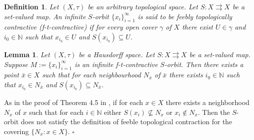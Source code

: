 \documentclass{article}
\renewcommand{\emptyset}{\varnothing}
\newcommand{\N}{\mathbb{N}}
\renewenvironment{proof}
         {\begin{trivlist}\item[
         {\bf Proof.}]}{{\hfill $\square$} \end{trivlist}}
\newtheorem{defi}[theo]{Definition}
\newtheorem{lemma}[theo]{Lemma}
\begin{document}


\begin{defi} \label{tau-contr} Let $(X, \tau)$ be an arbitrary topological space. Let $S:X \rightrightarrows X$ be a set-valued map. An infinite $S$-orbit $\{x_i\}_{i = 1}^{\infty}$ is said to be feebly topologically contractive (f-t-contractive) if for every open cover $\gamma$ of $X$ there exist $U \in \gamma$ and $i_0 \in \N$ such that $x_{i_0} \in U$ and $S(x_{i_0}) \subseteq U$.
\end{defi}




\begin{lemma} \label{f-t-orbit}
Let $(X, \tau)$ be a Hausdorff space. Let $S: X \rightrightarrows X$ be a set-valued map. Suppose $M:=\{x_i\}_{i=1}^{\infty}$ is an infinite f-t-contractive $S$-orbit. Then there exists a point $\bar{x} \in X$ such that for each neighbourhood $N_{\bar{x}}$ of $\bar{x}$ there exists $i_0 \in \N$ such that $x_{i_0} \in N_{\bar{x}}$ and $S(x_{i_0}) \subseteq N_{\bar{x}}$.
\end{lemma}
\begin{proof}
As in the proof of Theorem 4.5 in \cite{MR}, if  for each $x \in X$ there exists a neighborhood $N_x$ of
$x$ such that for each $i \in \N$ either $S(x_i) \nsubseteq N_x$ or $x_i \notin N_x$. Then the $S$-orbit does not satisfy the definition of
feeble topological contraction for the covering $\{N_x : x \in X\}$.
\end{proof}
\end{document}

